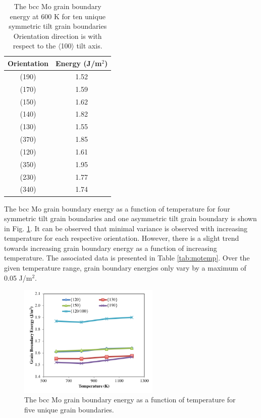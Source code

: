 \documentclass[review]{elsarticle}
\begin{document}
\begin{table}[h]
\caption{The bcc Mo grain boundary energy at 600 K for ten unique symmetric tilt grain boundaries Orientation direction is with respect to the $\langle$100$\rangle$ tilt axis.} \label{tab:mo600}
\begin{center}
\begin{tabular}{|c|c|}
	\hline
	Orientation & Energy (J/m$^{2}$) \\
	 \hline
	 (190) & 1.52 \\
	 (170) & 1.59 \\
	 (150) & 1.62 \\
	 (140) & 1.82 \\
	 (130) & 1.55 \\	 
	 (370) & 1.85 \\
	 (120) & 1.61 \\
	 (350) & 1.95 \\
	 (230) & 1.77 \\
	 (340) & 1.74 \\
	 \hline
\end{tabular}
\end{center}
\label{default}
\end{table}

\FloatBarrier

The bcc Mo grain boundary energy as a function of temperature for four symmetric tilt grain boundaries and one asymmetric tilt grain boundary is shown in Fig. \ref{fig:motemp}. It can be observed that minimal variance is observed with increasing temperature for each respective orientation. However, there is a slight trend towards increasing grain boundary energy as a function of increasing temperature. The associated data is presented in Table \ref{tab:motemp}. Over the given temperature range, grain boundary energies only vary by a maximum of 0.05 J/m$^{2}$.

\begin{figure}[h]
 \centering
 \includegraphics[width=0.6\textwidth]{mo_temp.png}
 \caption{The bcc Mo grain boundary energy as a function of temperature for five unique grain boundaries.}
 \label{fig:motemp}
\end{figure}
\end{document}
